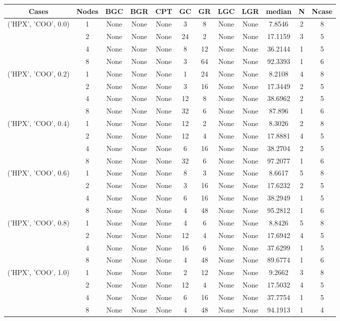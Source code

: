 \begin{tabular}{cccccccccccc}
\hline
Cases & Nodes& BGC& BGR& CPT& GC& GR& LGC& LGR& median & N & Ncase \\
\hline
\multirow{4}{*}{('HPX', 'COO', 0.0)}& 1& None& None& None& 3& 8& None& None& 7.8546& 2& 8\\
& 2& None& None& None& 24& 2& None& None& 17.1159& 3& 5\\
& 4& None& None& None& 8& 12& None& None& 36.2144& 1& 5\\
& 8& None& None& None& 3& 64& None& None& 92.3393& 1& 6\\
\hline
\multirow{4}{*}{('HPX', 'COO', 0.2)}& 1& None& None& None& 1& 24& None& None& 8.2108& 4& 8\\
& 2& None& None& None& 3& 16& None& None& 17.3449& 2& 5\\
& 4& None& None& None& 12& 8& None& None& 38.6962& 2& 5\\
& 8& None& None& None& 32& 6& None& None& 87.896& 1& 6\\
\hline
\multirow{4}{*}{('HPX', 'COO', 0.4)}& 1& None& None& None& 12& 2& None& None& 8.3026& 2& 8\\
& 2& None& None& None& 12& 4& None& None& 17.8881& 4& 5\\
& 4& None& None& None& 6& 16& None& None& 38.2704& 2& 5\\
& 8& None& None& None& 32& 6& None& None& 97.2077& 1& 6\\
\hline
\multirow{4}{*}{('HPX', 'COO', 0.6)}& 1& None& None& None& 8& 3& None& None& 8.6617& 5& 8\\
& 2& None& None& None& 3& 16& None& None& 17.6232& 2& 5\\
& 4& None& None& None& 6& 16& None& None& 38.2949& 1& 5\\
& 8& None& None& None& 4& 48& None& None& 95.2812& 1& 6\\
\hline
\multirow{4}{*}{('HPX', 'COO', 0.8)}& 1& None& None& None& 4& 6& None& None& 8.8426& 5& 8\\
& 2& None& None& None& 12& 4& None& None& 17.6942& 4& 5\\
& 4& None& None& None& 16& 6& None& None& 37.6299& 1& 5\\
& 8& None& None& None& 4& 48& None& None& 89.6774& 1& 6\\
\hline
\multirow{4}{*}{('HPX', 'COO', 1.0)}& 1& None& None& None& 2& 12& None& None& 9.2662& 3& 8\\
& 2& None& None& None& 12& 4& None& None& 17.5032& 4& 5\\
& 4& None& None& None& 6& 16& None& None& 37.7754& 1& 5\\
& 8& None& None& None& 4& 48& None& None& 94.1913& 1& 4\\
\hline
\end{tabular}
